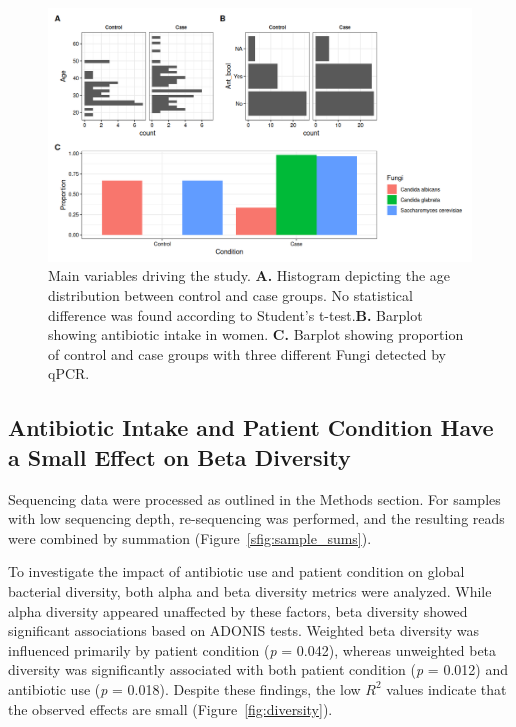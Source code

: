 \documentclass[biotech,article,submit,pdftex,moreauthors]{Definitions/mdpi}
\begin{document}
\begin{figure}[H]
	\centering
	\includegraphics[width = \textwidth]{figures/metadata.png}
	\caption{Main variables driving the study. \textbf{A.} Histogram depicting the age distribution between control and case groups. No statistical difference was found according to Student's t-test.\textbf{B.} Barplot showing antibiotic intake in women. \textbf{C.} Barplot showing proportion of control and case groups with three different Fungi detected by qPCR.}
	\label{fig:metadata}
\end{figure}   


\subsection{Antibiotic Intake and Patient Condition Have a Small Effect on Beta Diversity}

Sequencing data were processed as outlined in the Methods section. For samples with low sequencing depth, re-sequencing was performed, and the resulting reads were combined by summation (Figure~\ref{sfig:sample_sums}). 

To investigate the impact of antibiotic use and patient condition on global bacterial diversity, both alpha and beta diversity metrics were analyzed. While alpha diversity appeared unaffected by these factors, beta diversity showed significant associations based on ADONIS tests. Weighted beta diversity was influenced primarily by patient condition (\textit{p} = 0.042), whereas unweighted beta diversity was significantly associated with both patient condition (\textit{p} = 0.012) and antibiotic use (\textit{p} = 0.018). Despite these findings, the low $R^2$ values indicate that the observed effects are small (Figure~\ref{fig:diversity}). 
\end{document}
